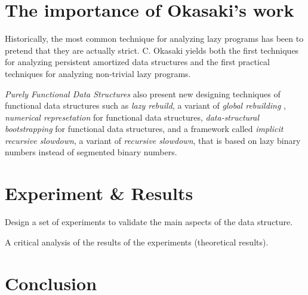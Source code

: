 \documentclass[12pt, a4paper]{article} %
\begin{document}

\section{The importance of Okasaki's work}%
\label{sec:importance}

Historically, the most common technique for analyzing lazy programs has been to pretend that they are actually strict.
C. Okasaki yields both the first techniques for analyzing persistent amortized data structures and the first practical techniques for analyzing non-trivial lazy programs.

\textit{Purely Functional Data Structures} also present new designing techniques of functional data structures such as \textit{lazy rebuild}, a variant of \textit{global rebuilding} \cite{ove83}, \textit{numerical represetation} for functional data structures, \textit{data-structural bootstrapping} for functional data structures, and a framework called \textit{implicit recursive slowdown}, a variant of \textit{recursive slowdown}, that is based on lazy binary numbers instead of segmented binary numbers.















\section{Experiment \& Results}%
\label{sec:experiment}

Design a set of experiments to validate the main aspects of the data structure.

A critical analysis of the results of the experiments (theoretical results).




















\section{Conclusion}%
\label{sec:conclusion}
\end{document}
